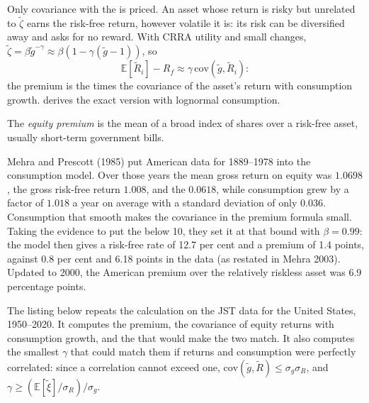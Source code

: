Only covariance with the  is priced. An asset whose return is risky but unrelated to
$\tilde\zeta$ earns the risk-free return, however volatile it is: its risk can be diversified away and
asks for no reward. With CRRA utility and small changes, $\tilde\zeta = \beta\tilde g^{-\gamma} \approx
\beta(1 - \gamma(\tilde g - 1))$, so
\[
\mathbb{E}[\tilde R_i] - R_f \approx \gamma\,\mathrm{cov}(\tilde g, \tilde R_i):
\]
the premium is the  times the covariance of the asset's return with
consumption growth.  derives the exact version with lognormal consumption.

\begin{definition}\label{def:b2:asset-prices:equity-premium}
The \emph{equity premium} is the mean  of a broad index of shares
over a risk-free asset, usually short-term government bills.
\end{definition}

\begin{record}
Mehra and Prescott (1985) put American data for 1889--1978 into the consumption model. Over those
years the mean gross return on equity was $1.0698$, the gross risk-free return $1.008$, and the  $0.0618$, while consumption grew by a factor of $1.018$ a year on average with a standard
deviation of only $0.036$. Consumption that smooth makes the covariance in the premium formula small.
Taking the evidence to put the  below 10, they set it at that
bound with $\beta = 0.99$: the model then gives a risk-free rate of 12.7 per cent and a premium of 1.4
points, against 0.8 per cent and 6.18 points in the data (as restated in Mehra 2003). Updated to 2000,
the American premium over the relatively riskless asset was 6.9 percentage points.
\end{record}

The listing below repeats the calculation on the JST data for the United States, 1950--2020. It
computes the premium, the covariance of equity returns with consumption growth, and the  that would make the two match. It also computes the smallest $\gamma$ that could
match them if returns and consumption were perfectly correlated: since a correlation cannot exceed one,
$\mathrm{cov}(\tilde g, \tilde R) \le \sigma_g\sigma_R$, and $\gamma \ge (\mathbb{E}[\tilde\xi]/\sigma_R)/
\sigma_g$.

